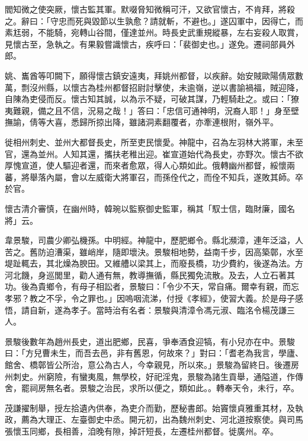 \begin{pinyinscope}
 閻知微之使突厥，懷古監其軍。默啜脅知微稱可汗，又欲官懷古，不肯拜，將殺之。辭曰：「守忠而死與毀節以生孰愈？請就斬，不避也。」遂囚軍中，因得亡，而素尪弱，不能騎，宛轉山谷間，僅達並州。時長史武重規縱暴，左右妄殺人取賞，見懷古至，急執之。有果毅嘗識懷古，疾呼曰：「裴御史也。」遂免。遷祠部員外郎。



 姚、巂酋等叩闕下，願得懷古鎮安遠夷，拜姚州都督，以疾辭。始安賊歐陽倩眾數萬，剽沒州縣，以懷古為桂州都督招尉討擊使，未逾嶺，逆以書諭禍福，賊迎降，自陳為吏侵而反。懷古知其誠，以為示不疑，可破其謀，乃輕騎赴之。或曰：「獠夷難親，備之且不信，況易之哉！」答曰：「忠信可通神明，況裔人耶！」身至壁撫諭，倩等大喜，悉歸所掠出降，雖諸洞素翻覆者，亦牽連根附，嶺外平。



 徙相州刺史、並州大都督長史，所至吏民懷愛。神龍中，召為左羽林大將軍，未至官，還為並州。人知其還，攜扶老稚出迎。崔宣道始代為長史，亦野次。懷古不欲厚愧宣道，使人驅迎者還，而來者愈眾，得人心類如此。俄轉幽州都督，綏懷兩蕃，將舉落內屬，會以左威衛大將軍召，而孫佺代之，而佺不知兵，遂敗其師。卒於官。



 懷古清介審慎，在幽州時，韓琬以監察御史監軍，稱其「馭士信，臨財廉，國名將」云。



 韋景駿，司農少卿弘機孫。中明經。神龍中，歷肥鄉令。縣北瀕漳，連年泛溢，人苦之。舊防迫漕渠，雖峭岸，隨即壞決。景駿相地勢，益南千步，因高築鄣，水至堤趾輒去，其北燥為腴田。又維艚以梁其上，而廢長橋，功少費約，後遂為法。方河北饑，身巡閭里，勸人通有無，教導撫循，縣民獨免流散。及去，人立石著其功。後為貴鄉令，有母子相訟者，景駿曰：「令少不天，常自痛。爾幸有親，而忘孝邪？教之不孚，令之罪也。」因嗚咽流涕，付授《孝經》，使習大義。於是母子感悟，請自新，遂為孝子。當時治有名者：景駿與清漳令馮元淑、臨洺令楊茂謙三人。



 景駿後數年為趙州長史，道出肥鄉，民喜，爭奉酒食迎犒，有小兒亦在中。景駿曰：「方兒曹未生，而吾去邑，非有舊恩，何故來？」對曰：「耆老為我言，學廬、館舍、橋鄣皆公所治，意公為古人，今幸親見，所以來。」景駿為留終日。後遷房州刺史。州窮險，有蠻夷風，無學校，好祀淫鬼，景駿為諸生貢舉，通隘道，作傳舍，罷祠房無名者。景駿之治民，求所以便之，類如此。。轉奉天令，未行，卒。



 茂謙擢制舉，授左拾遺內供奉，為吏介而勤，歷秘書郎。始竇懷貞雅重其材，及執政，薦為大理正、左臺御史中丞。開元初，出為魏州刺史、河北道按察使。與司馬張懷玉同鄉，長相善，洎晚有隙，掉訐短長，左遷桂州都督。徙廣州。卒。




\end{pinyinscope}
